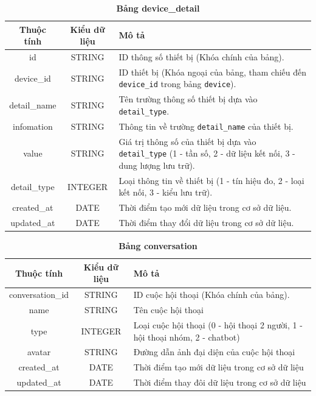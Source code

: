 \begin{table}[H]
  \caption{\bfseries \fontsize{12pt}{0pt}\selectfont Bảng device\_detail}
  \centering
  \begin{tabularx}{0.9\textwidth}{|c|c|X|}
    \hline
    \textbf{Thuộc tính} & \textbf{Kiểu dữ liệu} & \textbf{Mô tả} \\
    \hline
    id & STRING & ID thông số thiết bị (Khóa chính của bảng). \\
    \hline
    device\_id & STRING & ID thiết bị (Khóa ngoại của bảng,  tham chiếu đến \texttt{device\_id} trong bảng \texttt{device}). \\
    \hline
    detail\_name & STRING & Tên trường thông số thiết bị dựa vào \texttt{detail\_type}. \\
    \hline
    infomation & STRING & Thông tin về trường \texttt{detail\_name} của thiết bị. \\
    \hline
    value & STRING & Giá trị thông số của thiết bị dựa vào \texttt{detail\_type} (1 - tần số, 2 - dữ liệu kết nối, 3 - dung lượng lưu trữ). \\
    \hline
    detail\_type & INTEGER & Loại thông tin về thiết bị (1 - tín hiệu đo, 2 - loại kết nối, 3 - kiểu lưu trữ). \\
    \hline
    created\_at & DATE & Thời điểm tạo mới dữ liệu trong cơ sở dữ liệu. \\
    \hline
    updated\_at & DATE & Thời điểm thay đổi dữ liệu trong cơ sở dữ liệu. \\
    \hline
  \end{tabularx}
\end{table}

\begin{table}[H]
  \caption{\bfseries \fontsize{12pt}{0pt}\selectfont Bảng conversation}
  \centering
  \begin{tabularx}{0.9\textwidth}{|c|c|X|}
    \hline
    \textbf{Thuộc tính} & \textbf{Kiểu dữ liệu} & \textbf{Mô tả} \\
    \hline
    conversation\_id & STRING & ID cuộc hội thoại (Khóa chính của bảng). \\
    \hline
    name & STRING & Tên cuộc hội thoại \\
    \hline
    type & INTEGER & Loại cuộc hội thoại (0 - hội thoại 2 người, 1 - hội thoại nhóm, 2 - chatbot) \\
    \hline
    avatar & STRING & Đường dẫn ảnh đại diện của cuộc hội thoại  \\
    \hline
    created\_at & DATE & Thời điểm tạo mới dữ liệu trong cơ sở dữ liệu \\
    \hline
    updated\_at & DATE & Thời điểm thay đôi dữ liệu trong cơ sở dữ liệu \\
    \hline
  \end{tabularx}
\end{table}

